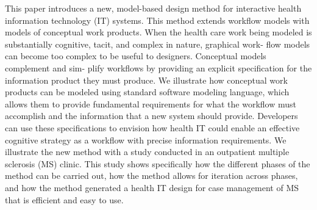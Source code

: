 This paper introduces a new, model-based design method for interactive health information technology (IT) systems. This method extends workflow models with models of conceptual work products. When the health care work being modeled is substantially cognitive, tacit, and complex in nature, graphical work- flow models can become too complex to be useful to designers. Conceptual models complement and sim- plify workflows by providing an explicit specification for the information product they must produce. We illustrate how conceptual work products can be modeled using standard software modeling language, which allows them to provide fundamental requirements for what the workflow must accomplish and the information that a new system should provide. Developers can use these specifications to envision how health IT could enable an effective cognitive strategy as a workflow with precise information requirements. We illustrate the new method with a study conducted in an outpatient multiple sclerosis (MS) clinic. This study shows specifically how the different phases of the method can be carried out, how the method allows for iteration across phases, and how the method generated a health IT design for case management of MS that is efficient and easy to use.

